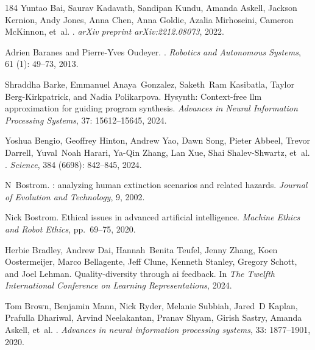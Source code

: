 \begin{thebibliography}{184}
Yuntao Bai, Saurav Kadavath, Sandipan Kundu, Amanda Askell, Jackson Kernion,
  Andy Jones, Anna Chen, Anna Goldie, Azalia Mirhoseini, Cameron McKinnon,
  et~al.
.
\newblock \emph{arXiv preprint arXiv:2212.08073}, 2022.

Adrien Baranes and Pierre-Yves Oudeyer.
.
\newblock \emph{Robotics and Autonomous Systems}, 61 (1):
  49--73, 2013.

Shraddha Barke, Emmanuel Anaya~Gonzalez, Saketh~Ram Kasibatla, Taylor
  Berg-Kirkpatrick, and Nadia Polikarpova.
\newblock Hysynth: Context-free llm approximation for guiding program
  synthesis.
\newblock \emph{Advances in Neural Information Processing Systems},
  37: 15612--15645, 2024.

Yoshua Bengio, Geoffrey Hinton, Andrew Yao, Dawn Song, Pieter Abbeel, Trevor
  Darrell, Yuval~Noah Harari, Ya-Qin Zhang, Lan Xue, Shai Shalev-Shwartz,
  et~al.
.
\newblock \emph{Science}, 384 (6698): 842--845, 2024.

N~Bostrom.
: analyzing human extinction scenarios and related
  hazards.
\newblock \emph{Journal of Evolution and Technology}, 9, 2002.

Nick Bostrom.
\newblock Ethical issues in advanced artificial intelligence.
\newblock \emph{Machine Ethics and Robot Ethics}, pp.\  69--75, 2020.

Herbie Bradley, Andrew Dai, Hannah~Benita Teufel, Jenny Zhang, Koen
  Oostermeijer, Marco Bellagente, Jeff Clune, Kenneth Stanley, Gregory Schott,
  and Joel Lehman.
\newblock Quality-diversity through ai feedback.
\newblock In \emph{The Twelfth International Conference on Learning
  Representations}, 2024.

Tom Brown, Benjamin Mann, Nick Ryder, Melanie Subbiah, Jared~D Kaplan, Prafulla
  Dhariwal, Arvind Neelakantan, Pranav Shyam, Girish Sastry, Amanda Askell,
  et~al.
.
\newblock \emph{Advances in neural information processing systems},
  33: 1877--1901, 2020.


\end{thebibliography}
